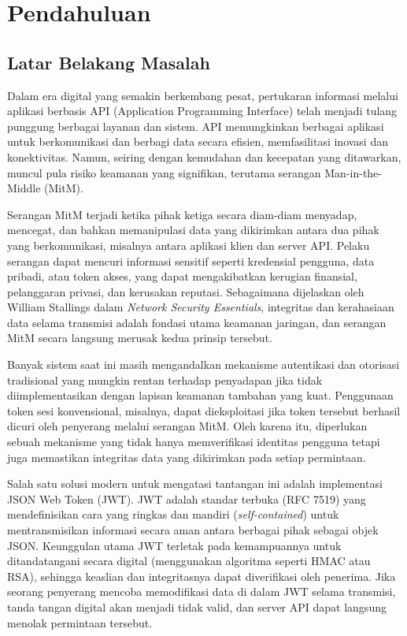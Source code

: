 \chapter{Pendahuluan}

\section{Latar Belakang Masalah}

Dalam era digital yang semakin berkembang pesat, pertukaran informasi melalui aplikasi berbasis API (Application Programming Interface) telah menjadi tulang punggung berbagai layanan dan sistem. API memungkinkan berbagai aplikasi untuk berkomunikasi dan berbagi data secara efisien, memfasilitasi inovasi dan konektivitas. Namun, seiring dengan kemudahan dan kecepatan yang ditawarkan, muncul pula risiko keamanan yang signifikan, terutama serangan Man-in-the-Middle (MitM).

Serangan MitM terjadi ketika pihak ketiga secara diam-diam menyadap, mencegat, dan bahkan memanipulasi data yang dikirimkan antara dua pihak yang berkomunikasi, misalnya antara aplikasi klien dan server API. Pelaku serangan dapat mencuri informasi sensitif seperti kredensial pengguna, data pribadi, atau token akses, yang dapat mengakibatkan kerugian finansial, pelanggaran privasi, dan kerusakan reputasi. Sebagaimana dijelaskan oleh William Stallings dalam \textit{Network Security Essentials}, integritas dan kerahasiaan data selama transmisi adalah fondasi utama keamanan jaringan, dan serangan MitM secara langsung merusak kedua prinsip tersebut.

Banyak sistem saat ini masih mengandalkan mekanisme autentikasi dan otorisasi tradisional yang mungkin rentan terhadap penyadapan jika tidak diimplementasikan dengan lapisan keamanan tambahan yang kuat. Penggunaan token sesi konvensional, misalnya, dapat dieksploitasi jika token tersebut berhasil dicuri oleh penyerang melalui serangan MitM. Oleh karena itu, diperlukan sebuah mekanisme yang tidak hanya memverifikasi identitas pengguna tetapi juga memastikan integritas data yang dikirimkan pada setiap permintaan.

Salah satu solusi modern untuk mengatasi tantangan ini adalah implementasi JSON Web Token (JWT). JWT adalah standar terbuka (RFC 7519) yang mendefinisikan cara yang ringkas dan mandiri (\textit{self-contained}) untuk mentransmisikan informasi secara aman antara berbagai pihak sebagai objek JSON. Keunggulan utama JWT terletak pada kemampuannya untuk ditandatangani secara digital (menggunakan algoritma seperti HMAC atau RSA), sehingga keaslian dan integritasnya dapat diverifikasi oleh penerima. Jika seorang penyerang mencoba memodifikasi data di dalam JWT selama transmisi, tanda tangan digital akan menjadi tidak valid, dan server API dapat langsung menolak permintaan tersebut.

